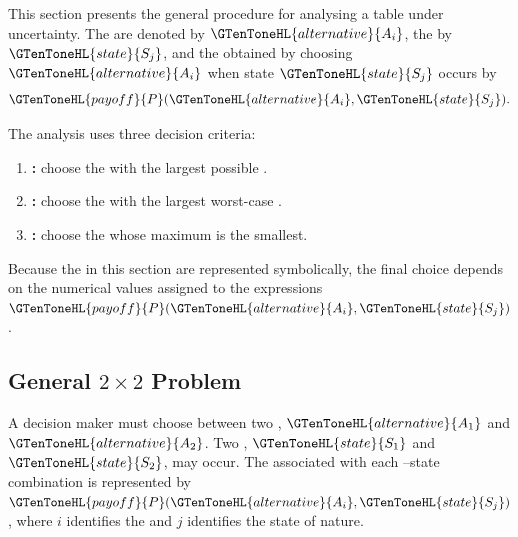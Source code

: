 	
	This section presents the general procedure for analysing a  table under
	uncertainty. The  are denoted by \(\GTenToneHL{alternative}{A_i}\), the    by
	\(\GTenToneHL{state}{S_j}\), and the  obtained by choosing  \(\GTenToneHL{alternative}{A_i}\) when state
	\(\GTenToneHL{state}{S_j}\) occurs by
	\[
	\GTenToneHL{payoff}{P}(\GTenToneHL{alternative}{A_i},\GTenToneHL{state}{S_j}).
	\]
	
	The analysis uses three decision criteria:
	
	\begin{enumerate}
		\item \textbf{:} choose the  with the largest possible
		.
		\item \textbf{:} choose the  with the largest worst-case
		.
		\item \textbf{ :} choose the  whose maximum
		  is the smallest.
	\end{enumerate}
	
	Because the  in this section are represented symbolically, the final
	choice depends on the numerical values assigned to the expressions
	\(\GTenToneHL{payoff}{P}(\GTenToneHL{alternative}{A_i},\GTenToneHL{state}{S_j})\).
	
	
	
	\subsection{General \(2\times 2\) Problem}
	\label{sec:general-problem-2x2}
	
	A decision maker must choose between two , \(\GTenToneHL{alternative}{A_1}\) and \(\GTenToneHL{alternative}{A_2}\).
	Two   , \(\GTenToneHL{state}{S_1}\) and \(\GTenToneHL{state}{S_2}\), may occur. The  associated
	with each --state combination is represented by \(\GTenToneHL{payoff}{P}(\GTenToneHL{alternative}{A_i},\GTenToneHL{state}{S_j})\),
	where \(i\) identifies the  and \(j\) identifies the state of
	nature.
	
